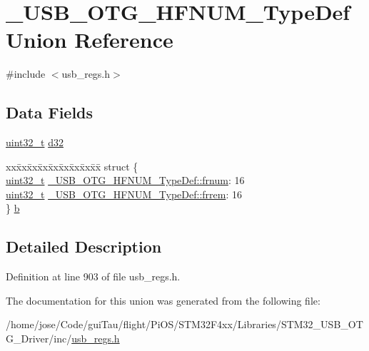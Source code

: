 \hypertarget{union___u_s_b___o_t_g___h_f_n_u_m___type_def}{\section{\-\_\-\-U\-S\-B\-\_\-\-O\-T\-G\-\_\-\-H\-F\-N\-U\-M\-\_\-\-Type\-Def Union Reference}
\label{union___u_s_b___o_t_g___h_f_n_u_m___type_def}
}


{\ttfamily \#include $<$usb\-\_\-regs.\-h$>$}

\subsection*{Data Fields}
\begin{DoxyCompactItemize}
\item 
\hyperlink{stdint_8h_a435d1572bf3f880d55459d9805097f62}{uint32\-\_\-t} \hyperlink{group___u_s_b___o_t_g___d_r_i_v_e_r_gafd506c89dade12ecf502cb311765a9f7}{d32}
\item 
\begin{tabbing}
xx\=xx\=xx\=xx\=xx\=xx\=xx\=xx\=xx\=\kill
struct \{\\
\>\hyperlink{stdint_8h_a435d1572bf3f880d55459d9805097f62}{uint32\_t} \hyperlink{group___u_s_b___o_t_g___d_r_i_v_e_r_gab61a09b828122eeb28511a7e31f67ec0}{\_USB\_OTG\_HFNUM\_TypeDef::frnum}: 16\\
\>\hyperlink{stdint_8h_a435d1572bf3f880d55459d9805097f62}{uint32\_t} \hyperlink{group___u_s_b___o_t_g___d_r_i_v_e_r_ga0b1c8ac23ba14c94587b89a7a5afaa94}{\_USB\_OTG\_HFNUM\_TypeDef::frrem}: 16\\
\} \hyperlink{group___u_s_b___o_t_g___d_r_i_v_e_r_gafbb7fd9abadae573851c92e650544422}{b}\\

\end{tabbing}\end{DoxyCompactItemize}


\subsection{Detailed Description}


Definition at line 903 of file usb\-\_\-regs.\-h.



The documentation for this union was generated from the following file\-:\begin{DoxyCompactItemize}
\item 
/home/jose/\-Code/gui\-Tau/flight/\-Pi\-O\-S/\-S\-T\-M32\-F4xx/\-Libraries/\-S\-T\-M32\-\_\-\-U\-S\-B\-\_\-\-O\-T\-G\-\_\-\-Driver/inc/\hyperlink{_s_t_m32_f4xx_2_libraries_2_s_t_m32___u_s_b___o_t_g___driver_2inc_2usb__regs_8h}{usb\-\_\-regs.\-h}\end{DoxyCompactItemize}
